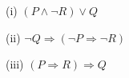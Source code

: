 \documentclass{article}
\begin{document}
(i) $(P \land \neg R) \lor Q$

(ii) $\neg Q \Rightarrow (\neg P \Rightarrow \neg R)$

(iii) $(P \Rightarrow R) \Rightarrow Q$
\end{document}
